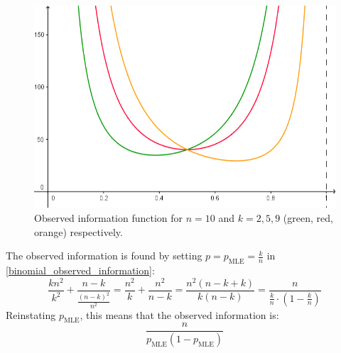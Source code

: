 \documentclass[12pt, a4paper]{article}
\numberwithin{equation}{section}
\begin{document}
\begin{figure}
\centering
\includegraphics[width=.8\textwidth]{binomial_observed_information}
\caption{Observed information function for $n=10$ and $k=2, 5, 9$ (green, red, orange) respectively.}
\label{fig:binomial_observed_information}
\end{figure}

The observed information is found by setting $p=p_{\textrm{MLE}}=\frac{k}{n}$ in \ref{binomial_observed_information}:
\begin{equation}
\frac{kn^2}{k^2}+\frac{n-k}{\frac{(n-k)^2}{n^2}}=\frac{n^2}{k}+\frac{n^2}{n-k}=\frac{n^2(n-k+k)}{k(n-k)}=\frac{n}{\frac{k}{n}\cdot\left(1-\frac{k}{n}\right)}
\end{equation}
Reinstating $p_{\textrm{MLE}}$, this means that the observed information is:
\begin{equation}
\frac{n}{p_{\textrm{MLE}}(1-p_{\textrm{MLE}})}
\end{equation}
\end{document}
